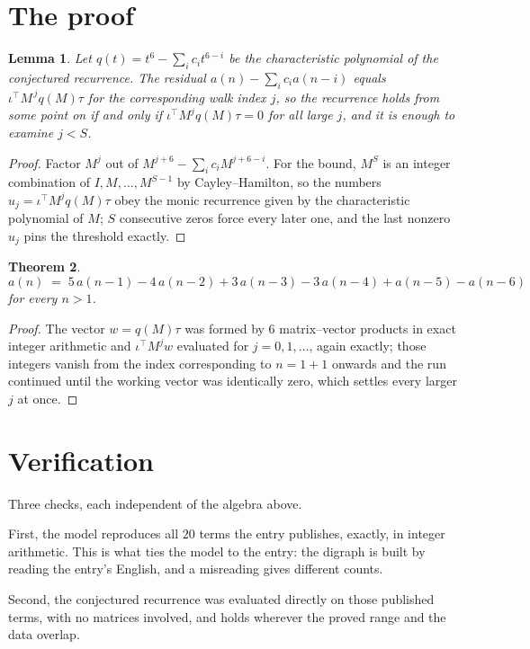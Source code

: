 \documentclass[11pt,a4paper]{article}
\theoremstyle{plain}
\newtheorem{theorem}{Theorem}
\newtheorem{lemma}[theorem]{Lemma}
\theoremstyle{definition}
\begin{document}
\section{The proof}

\begin{lemma}\label{lem:crit}
Let $q(t)=t^{6}-\sum_i c_it^{6-i}$ be the characteristic polynomial of the
conjectured recurrence. The residual $a(n)-\sum_ic_ia(n-i)$ equals
$\iota^{\!\top}M^{\,j}q(M)\tau$ for the corresponding walk index $j$, so the recurrence
holds from some point on if and only if $\iota^{\!\top}M^{j}q(M)\tau=0$ for all large $j$,
and it is enough to examine $j<S$.
\end{lemma}

\begin{proof}
Factor $M^{j}$ out of $M^{j+6}-\sum_ic_iM^{j+6-i}$. For the bound, $M^{S}$
is an integer combination of $I,M,\dots,M^{S-1}$ by Cayley--Hamilton, so the numbers
$u_j=\iota^{\!\top}M^{j}q(M)\tau$ obey the monic recurrence given by the characteristic
polynomial of $M$; $S$ consecutive zeros force every later one, and the last nonzero $u_j$
pins the threshold exactly.
\end{proof}

\begin{theorem}
\[
a(n)\;=\;5\,a(n-1) - 4\,a(n-2) + 3\,a(n-3) - 3\,a(n-4) + a(n-5) - a(n-6)
\]
for every $n>1$.
\end{theorem}

\begin{proof}
The vector $w=q(M)\tau$ was formed by $6$ matrix--vector products in exact integer
arithmetic and $\iota^{\!\top}M^{j}w$ evaluated for $j=0,1,\dots$, again exactly; those
integers vanish from the index corresponding to $n=1+1$ onwards and the run continued
until the working vector was identically zero, which settles every larger $j$ at once.
\end{proof}

\section{Verification}

Three checks, each independent of the algebra above.

First, the model reproduces all $20$ terms the entry publishes, exactly, in integer
arithmetic. This is what ties the model to the entry: the digraph is built by reading the
entry's English, and a misreading gives different counts.

Second, the conjectured recurrence was evaluated directly on those published terms, with no
matrices involved, and holds wherever the proved range and the data overlap.
\end{document}
